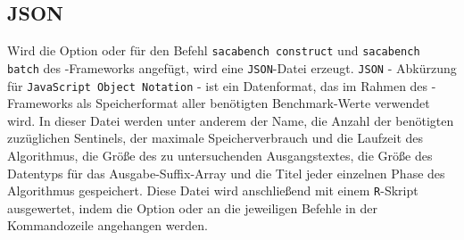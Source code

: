 \subsection{JSON}

Wird die Option  oder  für den Befehl \texttt{sacabench construct} und \texttt{sacabench batch} des \sacabench-Frameworks angefügt, wird eine \texttt{JSON}-Datei erzeugt. \texttt{JSON} - Abkürzung für \texttt{JavaScript Object Notation} - ist ein Datenformat, das im Rahmen des \sacabench-Frameworks als Speicherformat aller benötigten Bench\-mark-Werte verwendet wird. In dieser Datei werden unter anderem der Name, die Anzahl der benötigten zuzüglichen Sentinels, der maximale Speicherverbrauch und die Laufzeit des Algorithmus, die Größe des zu untersuchenden Ausgangstextes, die Größe des Datentyps für das Ausgabe-Suffix-Array und die Titel jeder einzelnen Phase des Algorithmus gespeichert. Diese Datei wird anschließend mit einem \texttt{R}-Skript ausgewertet, indem die Option  oder  an die jeweiligen Befehle in der Kommandozeile angehangen werden.

